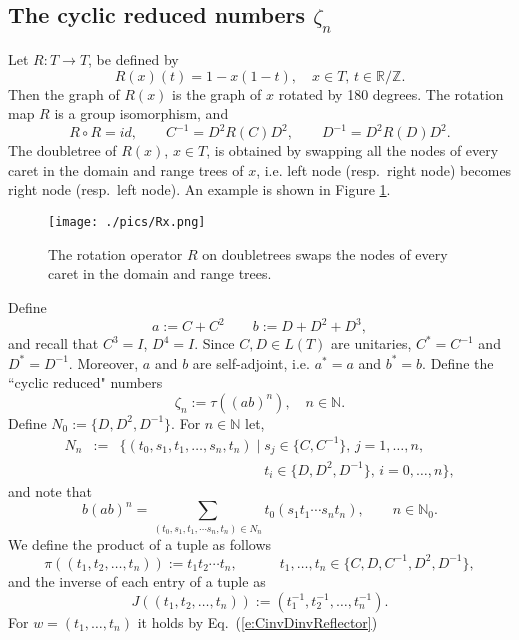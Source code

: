 \documentclass{amsart}
\newcommand{\R}{\mathbb R}
\newcommand{\N}{\mathbb N}
\newcommand{\Z}{\mathbb Z}
\theoremstyle{definition}
\begin{document}
\subsection{The cyclic reduced numbers $\zeta_n$}
Let $R:T\to T$, be defined by
$$R(x)(t) = 1-x(1-t), \quad   x\in T,\, t\in\R/\Z.$$ 
 Then the graph of $R(x)$ is the graph of $x$ rotated by 180 degrees. The rotation map $R$ is a group isomorphism, and
 \begin{equation}\label{e:CinvDinvReflector}
 R\circ R= id,\qquad C^{-1}=D^2 R(C) D^2, \qquad D^{-1}=D^2R(D) D^2.
 \end{equation}
 The doubletree of $R(x)$, $x\in T$, is obtained by swapping all the nodes of every caret in the domain and range trees of $x$, i.e. left node (resp.~right node) becomes right node (resp.~left node). An example is shown in Figure 
\ref{f:Rx-example}.\\
\begin{figure}
\texttt{[image: ./pics/Rx.png]}\\
  \caption{ The rotation operator $R$ on doubletrees swaps the nodes of every caret in the domain and range trees.  
  }\label{f:Rx-example}
\end{figure}
Define
$$a:=C+C^2\qquad b:=D+D^2+D^3,$$
and recall that $C^3=I$, $D^4=I$. Since $C, D\in L(T)$ are unitaries, $C^*=C^{-1}$ and $D^*=D^{-1}$. Moreover, $a$ and $b$ are self-adjoint, i.e. $a^*=a$ and $b^*=b$.
Define the ``cyclic reduced" numbers
$$\zeta_n:=\tau((ab)^n),\quad n\in\N.$$
Define $N_0:=\{D,D^2,D^{-1}\}$. For $n\in\N$ let,
\begin{eqnarray*}
N_n&:=&\{(t_0,s_1,t_1,\ldots,s_n,t_{n})\mid s_j\in\{C,C^{-1}\},\,j=1,\ldots,n,\,\,\\
&& \qquad\qquad\qquad \qquad \qquad \,\,t_i\in\{D,D^2,D^{-1}\},\,i=0,\ldots,n\},
\end{eqnarray*}
and note that 
$$ b(ab)^n=\sum_{(t_0,s_1,t_1,\cdots s_n,t_{n})\in N_n} t_0(s_1t_1\cdots s_nt_{n}),\qquad n\in\N_0.$$
We define the product of a tuple as follows
\begin{equation}\label{e:letterproduct}
\pi((t_1,t_2,\ldots, t_n)):=t_1t_2\cdots t_{n},\qquad\quad t_1,\ldots,t_n\in\{C,D,C^{-1},D^2,D^{-1}\},
\end{equation}
and the inverse of each entry of a tuple as
\begin{equation}\label{e:letterinverse}
J((t_1,t_2,\ldots, t_{n})):=(t_1^{-1},t_2^{-1},\ldots,t_n^{-1}).
\end{equation}
For $w=(t_1,\ldots, t_{n})$ it holds by Eq.~(\ref{e:CinvDinvReflector})
\end{document}
